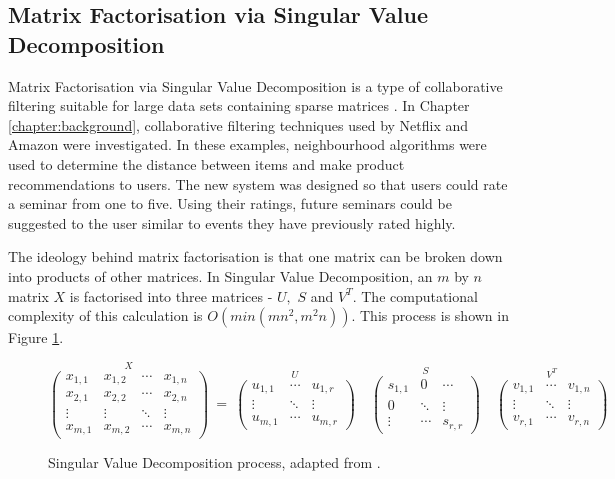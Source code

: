 \documentclass{l4proj}
\begin{document}
\subsection{Matrix Factorisation via Singular Value Decomposition}
\label{section:matrixfactorisationviasvd}

Matrix Factorisation via Singular Value Decomposition is a type of collaborative filtering suitable for large data sets containing sparse matrices \citep{mfviasvd}. In Chapter \ref{chapter:background}, collaborative filtering techniques used by Netflix and Amazon were investigated. In these examples, neighbourhood algorithms were used to determine the distance between items and make product recommendations to users. The new system was designed so that users could rate a seminar from one to five. Using their ratings, future seminars could be suggested to the user similar to events they have previously rated highly. 

The ideology behind matrix factorisation is that one matrix can be broken down into products of other matrices. In Singular Value Decomposition, an $m$ by $n$ matrix $X$ is factorised into three matrices - $U,$ $S$ and $V^T.$ The computational complexity of this calculation is $O(min(mn^2, m^2n))$. This process is shown in Figure \ref{fig:singular_value_decomposition}.

\begin{figure}[htb]
    \[
    \stackrel{\mbox{$X$}}{
        \begin{pmatrix}
            x_{1,1} & x_{1,2} & \cdots & x_{1,n} \\
            x_{2,1} & x_{2,2} & \cdots & x_{2,n} \\
            \vdots  & \vdots  & \ddots & \vdots  \\
            x_{m,1} & x_{m,2} & \cdots & x_{m,n} 
        \end{pmatrix}
    }
    ~
    =
    ~
    \stackrel{\mbox{$U$}}{
        \begin{pmatrix}
            u_{1,1} & \cdots & u_{1,r} \\
            \vdots  & \ddots & \vdots  \\
            u_{m,1} & \cdots & u_{m,r} 
        \end{pmatrix}
    }
    \quad
    \stackrel{\mbox{$S$}}{
        \begin{pmatrix}
            s_{1,1} & 0 & \cdots \\
            0  & \ddots & \vdots  \\
            \vdots & \cdots & s_{r,r} 
        \end{pmatrix}
    }
    \quad
    \stackrel{\mbox{$V^T$}}{
        \begin{pmatrix}
            v_{1,1} & \cdots & v_{1,n} \\
            \vdots  & \ddots & \vdots  \\
            v_{r,1} & \cdots & v_{r,n} 
        \end{pmatrix}
    }
    \]
    \caption{Singular Value Decomposition process, adapted from \cite{mfviasvd}.}
    \label{fig:singular_value_decomposition} 
\end{figure}
\end{document}
